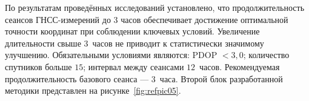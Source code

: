 По результатам проведённых исследований установлено, что продолжительность сеансов ГНСС-измерений до 3 часов обеспечивает достижение оптимальной точности координат при соблюдении ключевых условий. Увеличение длительности свыше 3~часов не приводит к статистически значимому улучшению. Обязательными условиями являются: PDOP $< 3,0$; количество спутников больше $15$; интервал между сеансами $12$~часов. Рекомендуемая продолжительность базового сеанса --- $3$~часа. Второй блок разработанной методики представлен на рисунке~\cref{fig:refpic05}.





